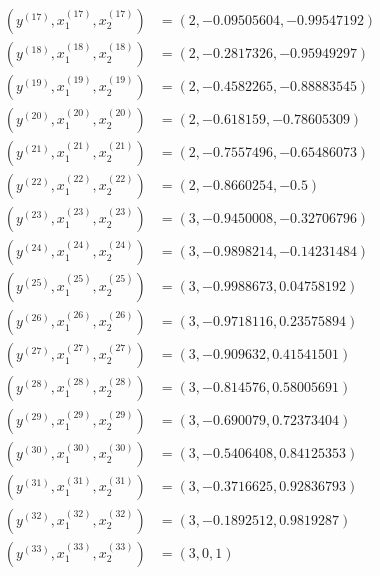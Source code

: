 \documentclass{article}
\begin{document}
\begin{align*}
\\ \left(y^{\left(17\right)}, x_{1}^{\left(17\right)}, x_{2}^{\left(17\right)}\right) &= \left(2,-0.09505604,-0.99547192\right)
\\ \left(y^{\left(18\right)}, x_{1}^{\left(18\right)}, x_{2}^{\left(18\right)}\right) &= \left(2,-0.2817326,-0.95949297\right)
\\ \left(y^{\left(19\right)}, x_{1}^{\left(19\right)}, x_{2}^{\left(19\right)}\right) &= \left(2,-0.4582265,-0.88883545\right)
\\ \left(y^{\left(20\right)}, x_{1}^{\left(20\right)}, x_{2}^{\left(20\right)}\right) &= \left(2,-0.618159,-0.78605309\right)
\\ \left(y^{\left(21\right)}, x_{1}^{\left(21\right)}, x_{2}^{\left(21\right)}\right) &= \left(2,-0.7557496,-0.65486073\right)
\\ \left(y^{\left(22\right)}, x_{1}^{\left(22\right)}, x_{2}^{\left(22\right)}\right) &= \left(2,-0.8660254,-0.5\right)
\\ \left(y^{\left(23\right)}, x_{1}^{\left(23\right)}, x_{2}^{\left(23\right)}\right) &= \left(3,-0.9450008,-0.32706796\right)
\\ \left(y^{\left(24\right)}, x_{1}^{\left(24\right)}, x_{2}^{\left(24\right)}\right) &= \left(3,-0.9898214,-0.14231484\right)
\\ \left(y^{\left(25\right)}, x_{1}^{\left(25\right)}, x_{2}^{\left(25\right)}\right) &= \left(3,-0.9988673,0.04758192\right)
\\ \left(y^{\left(26\right)}, x_{1}^{\left(26\right)}, x_{2}^{\left(26\right)}\right) &= \left(3,-0.9718116,0.23575894\right)
\\ \left(y^{\left(27\right)}, x_{1}^{\left(27\right)}, x_{2}^{\left(27\right)}\right) &= \left(3,-0.909632,0.41541501\right)
\\ \left(y^{\left(28\right)}, x_{1}^{\left(28\right)}, x_{2}^{\left(28\right)}\right) &= \left(3,-0.814576,0.58005691\right)
\\ \left(y^{\left(29\right)}, x_{1}^{\left(29\right)}, x_{2}^{\left(29\right)}\right) &= \left(3,-0.690079,0.72373404\right)
\\ \left(y^{\left(30\right)}, x_{1}^{\left(30\right)}, x_{2}^{\left(30\right)}\right) &= \left(3,-0.5406408,0.84125353\right)
\\ \left(y^{\left(31\right)}, x_{1}^{\left(31\right)}, x_{2}^{\left(31\right)}\right) &= \left(3,-0.3716625,0.92836793\right)
\\ \left(y^{\left(32\right)}, x_{1}^{\left(32\right)}, x_{2}^{\left(32\right)}\right) &= \left(3,-0.1892512,0.9819287\right)
\\ \left(y^{\left(33\right)}, x_{1}^{\left(33\right)}, x_{2}^{\left(33\right)}\right) &= \left(3,0,1\right)
\end{align*}
\end{document}
